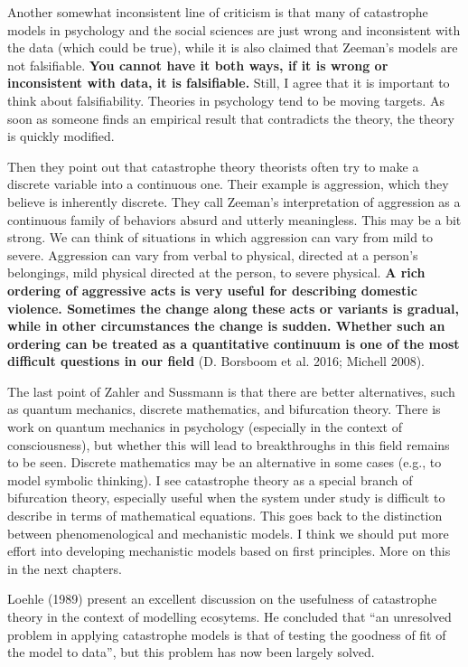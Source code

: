 \documentclass[
  letterpaper,
]{scrbook}
\begin{document}
Another somewhat inconsistent line of criticism is that many of
catastrophe models in psychology and the social sciences are just wrong
and inconsistent with the data (which could be true), while it is also
claimed that Zeeman's models are not falsifiable. \textbf{You cannot
have it both ways, if it is wrong or inconsistent with data, it is
falsifiable.} Still, I agree that it is important to think about
falsifiability. Theories in psychology tend to be moving targets. As
soon as someone finds an empirical result that contradicts the theory,
the theory is quickly modified.

Then they point out that catastrophe theory theorists often try to make
a discrete variable into a continuous one. Their example is aggression,
which they believe is inherently discrete. They call Zeeman's
interpretation of aggression as a continuous family of behaviors absurd
and utterly meaningless. This may be a bit strong. We can think of
situations in which aggression can vary from mild to severe. Aggression
can vary from verbal to physical, directed at a person's belongings,
mild physical directed at the person, to severe physical. \textbf{A rich
ordering of aggressive acts is very useful for describing domestic
violence. Sometimes the change along these acts or variants is gradual,
while in other circumstances the change is sudden. Whether such an
ordering can be treated as a quantitative continuum is one of the most
difficult questions in our field} (D. Borsboom et al. 2016; Michell
2008).

The last point of Zahler and Sussmann is that there are better
alternatives, such as quantum mechanics, discrete mathematics, and
bifurcation theory. There is work on quantum mechanics in psychology
(especially in the context of consciousness), but whether this will lead
to breakthroughs in this field remains to be seen. Discrete mathematics
may be an alternative in some cases (e.g., to model symbolic thinking).
I see catastrophe theory as a special branch of bifurcation theory,
especially useful when the system under study is difficult to describe
in terms of mathematical equations. This goes back to the distinction
between phenomenological and mechanistic models. I think we should put
more effort into developing mechanistic models based on first
principles. More on this in the next chapters.

Loehle (1989) present an excellent discussion on the usefulness of
catastrophe theory in the context of modelling ecosytems. He concluded
that ``an unresolved problem in applying catastrophe models is that of
testing the goodness of fit of the model to data'', but this problem has
now been largely solved.
\end{document}
